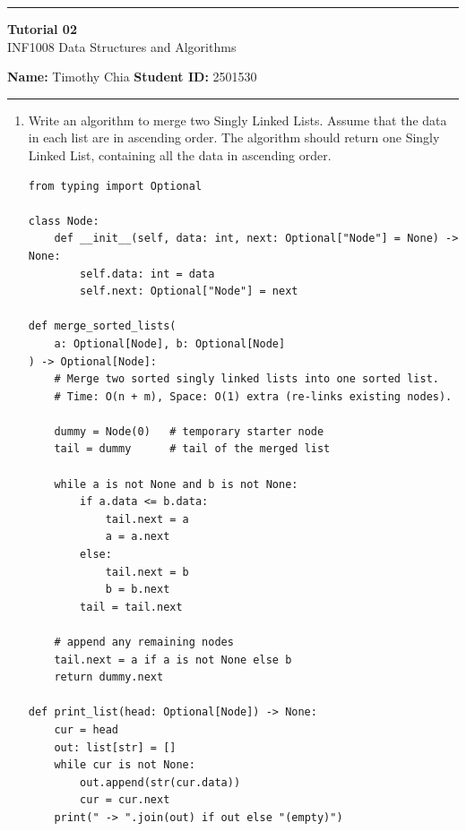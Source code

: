 \documentclass[12pt]{scrartcl}
\begin{document}
\begin{center}
	\hrule
	\vspace{0.4cm}
	{\textbf{\large Tutorial 02}}\\[0.2cm]
	INF1008 Data Structures and Algorithms
\end{center}

\textbf{Name:} Timothy Chia\hspace{\fill} \textbf{Student ID:} 2501530\\

\hrule

\vspace{0.3cm}

\begin{enumerate}[label=\textbf{\arabic*.}]

	\item
	      Write an algorithm to merge two Singly Linked Lists.
	      Assume that the data in each list are in ascending order.
	      The algorithm should return one Singly Linked List, containing all the data in ascending order.

	      \vspace{0.3cm}
	      \begin{lstlisting}
from typing import Optional

class Node:
    def __init__(self, data: int, next: Optional["Node"] = None) -> None:
        self.data: int = data
        self.next: Optional["Node"] = next

def merge_sorted_lists(
    a: Optional[Node], b: Optional[Node]
) -> Optional[Node]:
    # Merge two sorted singly linked lists into one sorted list.
    # Time: O(n + m), Space: O(1) extra (re-links existing nodes).

    dummy = Node(0)   # temporary starter node
    tail = dummy      # tail of the merged list

    while a is not None and b is not None:
        if a.data <= b.data:
            tail.next = a
            a = a.next
        else:
            tail.next = b
            b = b.next
        tail = tail.next

    # append any remaining nodes
    tail.next = a if a is not None else b
    return dummy.next

def print_list(head: Optional[Node]) -> None:
    cur = head
    out: list[str] = []
    while cur is not None:
        out.append(str(cur.data))
        cur = cur.next
    print(" -> ".join(out) if out else "(empty)")
\end{lstlisting}


\end{enumerate}
\end{document}
